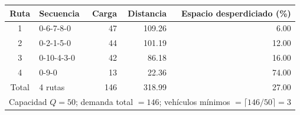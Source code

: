 \begin{tabular}{clrrr}
\toprule
Ruta & Secuencia & Carga & Distancia & Espacio desperdiciado (\%) \\
\midrule
1 & 0-6-7-8-0 & 47 & 109.26 & 6.00 \\
2 & 0-2-1-5-0 & 44 & 101.19 & 12.00 \\
3 & 0-10-4-3-0 & 42 & 86.18 & 16.00 \\
4 & 0-9-0 & 13 & 22.36 & 74.00 \\
\midrule
Total & 4 rutas & 146 & 318.99 & 27.00 \\
\midrule
\multicolumn{5}{l}{Capacidad $Q=50$; demanda total $=146$; vehículos mínimos $=\lceil 146/50 \rceil = 3$} \\
\bottomrule
\end{tabular}
